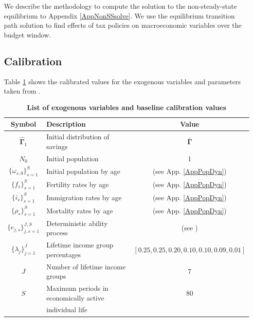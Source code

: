 \documentclass[letterpaper,12pt]{article}
\theoremstyle{definition}
\begin{document}
\begin{spacing}{1.5}
    \vspace{10mm}

    We describe the methodology to compute the solution to the non-steady-state equilibrium to Appendix \ref{AppNonSSsolve}.  We use the equilibrium transition path solution to find effects of tax policies on macroeconomic variables over the budget window.


  \subsection{Calibration}\label{SecCalib}

    Table \ref{TabExogVars} shows the calibrated values for the exogenous variables and parameters taken from \citet{DEMPRW2015}.

    \begin{table}[htbp] \centering \captionsetup{width=4.7in}
    \caption{\label{TabExogVars}\textbf{List of exogenous variables and baseline calibration values}}
      \begin{threeparttable}
      \begin{tabular}{>{\footnotesize}c |>{\footnotesize}l |>{\footnotesize}c}
        \hline\hline
        Symbol & \quad\quad\quad\quad Description & Value \\
        \hline
        $\bm{\hat{\Gamma}}_1$ & Initial distribution of savings & $\bm{\bar{\Gamma}}$ \\
        $N_0$ & Initial population & 1 \\
        $\{\omega_{s,0}\}_{s=1}^S$ & Initial population by age & (see App. \ref{AppPopDyn}) \\
        $\{f_s\}_{s=1}^S$ & Fertility rates by age & (see App. \ref{AppPopDyn}) \\
        $\{i_s\}_{s=1}^S$ & Immigration rates by age & (see App. \ref{AppPopDyn}) \\
        $\{\rho_s\}_{s=1}^S$ & Mortality rates by age & (see App. \ref{AppPopDyn}) \\
        $\{e_{j,s}\}_{j,s=1}^{J,S}$ & Deterministic ability process & (see \citealp{DEMPRW2015}) \\
        $\{\lambda_j\}_{j=1}^J$ & Lifetime income group percentages & $[0.25,0.25,0.20,0.10,0.10,0.09,0.01]$ \\
        $J$ & Number of lifetime income groups & 7 \\
        $S$ & Maximum periods in economically active & 80 \\[-2mm]
        &\quad individual life & \\

\end{tabular}
\end{threeparttable}
\end{table}
\end{spacing}
\end{document}
